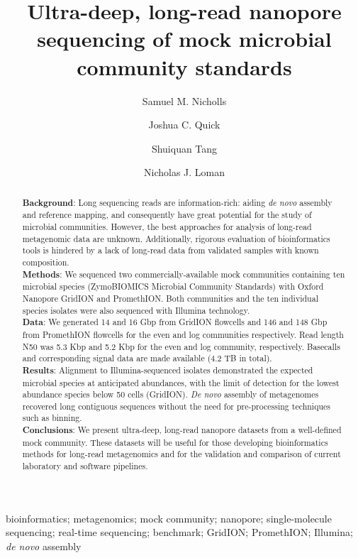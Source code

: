 \documentclass[a4paper,num-refs]{oup-contemporary}
\title{Ultra-deep, long-read nanopore sequencing of mock microbial community standards}
\author[1\authfn{2}]{Samuel M. Nicholls}
\author[1\authfn{2}]{Joshua C. Quick}
\author[2]{Shuiquan Tang}
\author[1\authfn{1}]{Nicholas J. Loman}
\affil[1]{Institute of Microbiology and Infection, School of Biosciences, University of Birmingham, UK}
\affil[2]{Zymo Research Corporation, Irvine, California, USA}
\begin{document}
\begin{frontmatter}
\maketitle
\begin{abstract}
\textbf{Background}: 
Long sequencing reads are information-rich: aiding \textit{de novo} assembly and reference mapping, and consequently have great potential for the study of microbial communities. However, the best approaches for analysis of long-read metagenomic data are unknown. Additionally, rigorous evaluation of bioinformatics tools is hindered by a lack of long-read data from validated samples with known composition.  \\
\textbf{Methods}: We sequenced two commercially-available mock communities containing ten microbial species (ZymoBIOMICS Microbial Community Standards) with Oxford Nanopore GridION and PromethION. Both communities and the ten individual species isolates were also sequenced with Illumina technology. \\
\textbf{Data}: We generated 14 and 16 Gbp from GridION flowcells and 146 and 148 Gbp from PromethION flowcells for the even and log communities respectively. Read length N50 was 5.3 Kbp and 5.2 Kbp for the even and log community, respectively. Basecalls and corresponding signal data are made available (4.2 TB in total).
\\
\textbf{Results}: Alignment to Illumina-sequenced isolates demonstrated the expected microbial species at anticipated abundances, with the limit of detection for the lowest abundance species below 50 cells (GridION). \textit{De novo} assembly of metagenomes recovered long contiguous sequences without the need for pre-processing techniques such as binning.
\\
\textbf{Conclusions}: We present ultra-deep, long-read nanopore datasets from a well-defined mock community. These datasets will be useful for those developing bioinformatics methods for long-read metagenomics and for the validation and comparison of current laboratory and software pipelines. 

\end{abstract}
\begin{keywords}
bioinformatics; metagenomics; mock community; nanopore; single-molecule sequencing; real-time sequencing; benchmark; GridION; PromethION; Illumina; \textit{de novo} assembly
\end{keywords}
\end{frontmatter}
\end{document}
